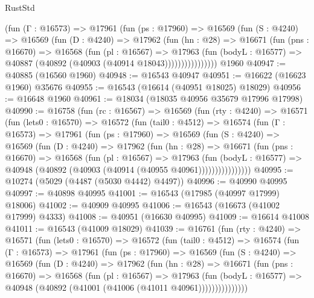\begin{lexlean}{RustStd}
\begin{coremodule}
              (fun (Γ : @16573) =>
              @17961
                (fun (ps : @17960) =>
                @16569
                  (fun (S : @4240) =>
                  @16569
                    (fun (D : @4240) =>
                    @17962
                      (fun (hn : @28) =>
                      @16671
                        (fun (pns : @16670) =>
                        @16568
                          (fun (pl : @16567) =>
                          @17963
                            (fun (bodyL : @16577) =>
                            @40887 (@40892 (@40903 (@40914 @18043))))))))))))))))
    @1960
@40947 := @40885 (@16560 @1960)
@40948 := @16543 @40947
@40951 := @16622 (@16623 @1960) @35676
@40955 := @16543 (@16614 (@40951 @18025) @18029)
@40956 := @16648 @1960
@40961 := @18034 (@18035 @40956 @35679 @17996 @17998)
@40990 := @16758
    (fun (rc : @16567) =>
    @16569
      (fun (rty : @4240) =>
      @16571
        (fun (lets0 : @16570) =>
        @16572
          (fun (tail0 : @4512) =>
          @16574
            (fun (Γ : @16573) =>
            @17961
              (fun (ps : @17960) =>
              @16569
                (fun (S : @4240) =>
                @16569
                  (fun (D : @4240) =>
                  @17962
                    (fun (hn : @28) =>
                    @16671
                      (fun (pns : @16670) =>
                      @16568
                        (fun (pl : @16567) =>
                        @17963
                          (fun (bodyL : @16577) =>
                          @40948 (@40892 (@40903 (@40914 (@40955 @40961))))))))))))))))
@40995 := @10274 (@5029 (@4487 (@5030 @4442) @4497))
@40996 := @40990 @40995
@40997 := @40898 @40995
@41001 := @16543 (@17985 (@40997 @17999) @18006)
@41002 := @40909 @40995
@41006 := @16543 (@16673 (@41002 @17999) @4333)
@41008 := @40951 (@16630 @40995)
@41009 := @16614 @41008
@41011 := @16543 (@41009 @18029)
@41039 := @16761
    (fun (rty : @4240) =>
    @16571
      (fun (lets0 : @16570) =>
      @16572
        (fun (tail0 : @4512) =>
        @16574
          (fun (Γ : @16573) =>
          @17961
            (fun (ps : @17960) =>
            @16569
              (fun (S : @4240) =>
              @16569
                (fun (D : @4240) =>
                @17962
                  (fun (hn : @28) =>
                  @16671
                    (fun (pns : @16670) =>
                    @16568
                      (fun (pl : @16567) =>
                      @17963
                        (fun (bodyL : @16577) =>
                        @40948 (@40892 (@41001 (@41006 (@41011 @40961)))))))))))))))

\end{coremodule}
\end{lexlean}
